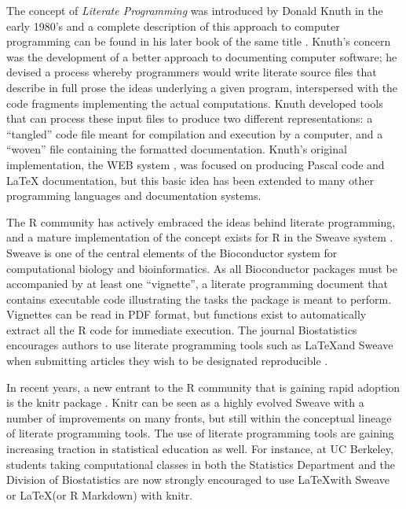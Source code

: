 \documentclass[ChapterTOCs,krantz2]{krantz} %
\begin{document}
The concept of \emph{Literate Programming} was introduced by Donald Knuth in
the early 1980's \cite{Knuth:1983:LP} and a complete description of this
approach to computer programming can be found in his later book of the same
title \cite{Knuth92}.  Knuth's concern was the development of a better approach
to documenting computer software; he devised a process whereby programmers
would write literate source files that describe in full prose the ideas
underlying a given program, interspersed with the code fragments implementing
the actual computations.  Knuth developed tools that can process these input
files to produce two different representations: a ``tangled'' code file meant
for compilation and execution by a computer, and a ``woven'' file containing
the formatted documentation.  Knuth's original implementation, the WEB system
\cite{Knuth:1983:WSS}, was focused on producing Pascal code and \LaTeX
documentation, but this basic idea has been extended to many other programming
languages and documentation systems.  

The R community has actively embraced the ideas behind literate programming,
and a mature implementation of the concept exists for R in the Sweave system
\cite{lmucs-papers:Leisch:2002}.  Sweave is one of the central elements of the
Bioconductor system \cite{Gentleman2004, Dudoit2003} for computational biology
and bioinformatics.  As all Bioconductor packages must be accompanied by at
least one ``vignette'', a literate programming document that contains
executable code illustrating the tasks the package is meant to perform.
Vignettes can be read in PDF format, but functions exist to automatically
extract all the R code for immediate execution.  The journal Biostatistics
encourages authors to use literate programming tools such as \LaTeX and Sweave
when submitting articles they wish to be designated reproducible \cite{Peng01072009}.

In recent years, a new entrant to the R community that is gaining rapid
adoption is the knitr package \cite{xie2012knitr}.  Knitr can be seen as a
highly evolved Sweave with a number of improvements on many fronts, but still
within the conceptual lineage of literate programming tools.  The use of
literate programming tools are gaining increasing traction in statistical
education as well.  For instance, at UC Berkeley, students taking computational
classes in both the Statistics Department and the Division of Biostatistics are
now strongly encouraged to use \LaTeX with Sweave or \LaTeX (or R Markdown) with 
knitr.
\end{document}
